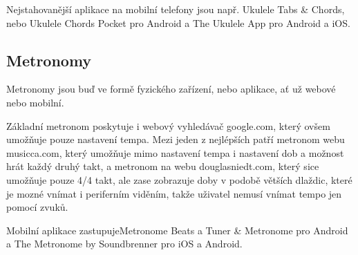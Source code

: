 Nejstahovanější aplikace na mobilní telefony jsou např. Ukulele Tabs \& Chords, nebo Ukulele Chords Pocket pro Android a The Ukulele App pro Android a iOS.

\subsection{Metronomy}
\label{ss:metronomes}
Metronomy jsou buď ve formě fyzického zařízení, nebo aplikace, ať už webové nebo mobilní.

Základní metronom poskytuje i webový vyhledávač google.com, který ovšem umožňuje pouze nastavení tempa. Mezi jeden z nejlépších patří metronom webu musicca.com, který umožňuje mimo nastavení tempa i nastavení dob a možnost hrát každý druhý takt, a metronom na webu douglasniedt.com, který sice umožňuje pouze 4/4 takt, ale zase zobrazuje doby v podobě větších dlaždic, které je mozné vnímat i periferním viděním, takže uživatel nemusí vnímat tempo jen pomocí zvuků.

Mobilní aplikace zastupujeMetronome Beats a Tuner \& Metronome pro Android a The Metronome by Soundbrenner pro iOS a Android.
